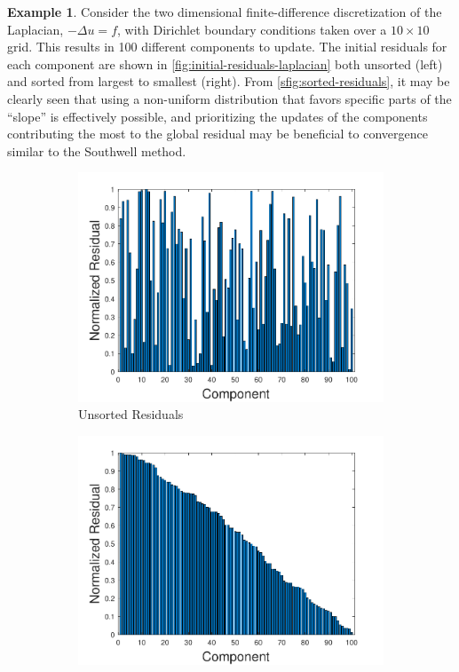 \documentclass{article}
\theoremstyle{definition}
\theoremstyle{example}
\newtheorem{example}{Example}
\theoremstyle{example}
\theoremstyle{example}
\begin{document}
\begin{example}
\label{example:sorted-residuals}
	Consider the two dimensional finite-difference discretization of the Laplacian, $-\Delta u = f$, with Dirichlet boundary conditions taken over a $10 \times 10$ grid. This results in 100 different components to update. The initial residuals for each component are shown in \cref{fig:initial-residuals-laplacian} both unsorted (left) and sorted from largest to smallest (right). From \cref{sfig:sorted-residuals}, it may be clearly seen that using a non-uniform distribution that favors specific parts of the ``slope'' is effectively possible, and prioritizing the updates of the components contributing the most to the global residual may be beneficial to convergence similar to the Southwell method.
	
	\begin{figure}[ht!]
		\centering
		\begin{subfigure}{0.45\textwidth}
			\includegraphics[width=\textwidth]{images/init_resids_10x10.pdf}
			\caption{Unsorted Residuals}
			\label{sfig:unsorted-residuals}
		\end{subfigure}
		\begin{subfigure}{0.45\textwidth}
			\includegraphics[width=\textwidth]{images/init_resids_10x10_sorted.pdf}

\end{subfigure}
\end{figure}
\end{example}
\end{document}

